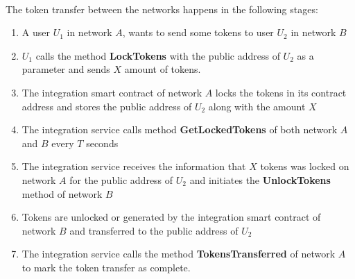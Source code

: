 \\ 
The token transfer between the networks happens in the following stages:
\begin{enumerate}
    \item A user $U_1$ in network $A$, wants to send some tokens to user $U_2$ in network $B$
    \item $U_1$ calls the method \textbf{LockTokens} with the public address of $U_2$ as a parameter and sends $X$ amount of tokens.
    \item The integration smart contract of network $A$ locks the tokens in its contract address and stores the public address of $U_2$ along with the amount $X$
    \item The integration service calls method \textbf{GetLockedTokens} of both network $A$ and $B$ every $T$ seconds
    \item The integration service receives the information that $X$ tokens was locked on network $A$ for the public address of $U_2$ and initiates the \textbf{UnlockTokens} method of network $B$
    \item Tokens are unlocked or generated by the integration smart contract of network $B$ and transferred to the public address of $U_2$
    \item The integration service calls the method \textbf{TokensTransferred} of network $A$ to mark the token transfer as complete.
\end{enumerate}
